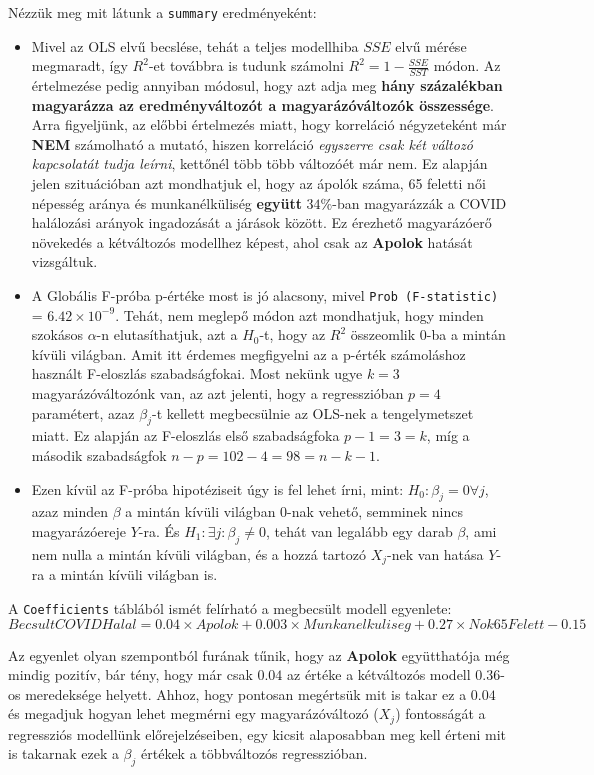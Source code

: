 \documentclass[
]{book}
\providecommand{\tightlist}{%
  \setlength{\itemsep}{0pt}\setlength{\parskip}{0pt}}
\begin{document}
Nézzük meg mit látunk a \texttt{summary} eredményeként:

\begin{itemize}
\tightlist
\item
  Mivel az OLS elvű becslése, tehát a teljes modellhiba \(SSE\) elvű mérése megmaradt, így \(R^2\)-et továbbra is tudunk számolni \(R^2=1-\frac{SSE}{SST}\) módon. Az értelmezése pedig annyiban módosul, hogy azt adja meg \textbf{hány százalékban magyarázza az eredményváltozót a magyarázóváltozók összessége}. Arra figyeljünk, az előbbi értelmezés miatt, hogy korreláció négyzeteként már \textbf{NEM} számolható a mutató, hiszen korreláció \emph{egyszerre csak két változó kapcsolatát tudja leírni}, kettőnél több több változóét már nem. Ez alapján jelen szituációban azt mondhatjuk el, hogy az ápolók száma, 65 feletti női népesség aránya és munkanélküliség \textbf{együtt} \(34\%\)-ban magyarázzák a COVID halálozási arányok ingadozását a járások között. Ez érezhető magyarázóerő növekedés a kétváltozós modellhez képest, ahol csak az \textbf{Apolok} hatását vizsgáltuk.
\item
  A Globális F-próba p-értéke most is jó alacsony, mivel \texttt{Prob\ (F-statistic)} = \(6.42 \times 10^{-9}\). Tehát, nem meglepő módon azt mondhatjuk, hogy minden szokásos \(\alpha\)-n elutasíthatjuk, azt a \(H_0\)-t, hogy az \(R^2\) összeomlik 0-ba a mintán kívüli világban. Amit itt érdemes megfigyelni az a p-érték számoláshoz használt F-eloszlás szabadságfokai. Most nekünk ugye \(k=3\) magyarázóváltozónk van, az azt jelenti, hogy a regresszióban \(p=4\) paramétert, azaz \(\beta_j\)-t kellett megbecsülnie az OLS-nek a tengelymetszet miatt. Ez alapján az F-eloszlás első szabadságfoka \(p-1=3=k\), míg a második szabadságfok \(n-p=102-4=98=n-k-1\).
\item
  Ezen kívül az F-próba hipotéziseit úgy is fel lehet írni, mint: \(H_0: \beta_j=0 \forall j\), azaz minden \(\beta\) a mintán kívüli világban 0-nak vehető, semminek nincs magyarázóereje \(Y\)-ra. És \(H_1: \exists j:\beta_j \neq 0\), tehát van legalább egy darab \(\beta\), ami nem nulla a mintán kívüli világban, és a hozzá tartozó \(X_j\)-nek van hatása \(Y\)-ra a mintán kívüli világban is.
\end{itemize}

A \texttt{Coefficients} táblából ismét felírható a megbecsült modell egyenlete: \[BecsultCOVIDHalal=0.04 \times Apolok + 0.003 \times Munkanelkuliseg + 0.27 \times Nok65Felett - 0.15\]

Az egyenlet olyan szempontból furának tűnik, hogy az \textbf{Apolok} együtthatója még mindig pozitív, bár tény, hogy már csak \(0.04\) az értéke a kétváltozós modell \(0.36\)-os meredeksége helyett.
Ahhoz, hogy pontosan megértsük mit is takar ez a \(0.04\) és megadjuk hogyan lehet megmérni egy magyarázóváltozó (\(X_j\)) fontosságát a regressziós modellünk előrejelzéseiben, egy kicsit alaposabban meg kell érteni mit is takarnak ezek a \(\beta_j\) értékek a többváltozós regresszióban.
\end{document}

